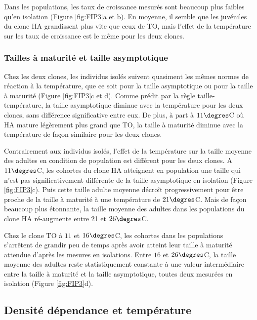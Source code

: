 Dans les populations, les taux de croissance mesurés sont beaucoup plus faibles
qu'en isolation (Figure \ref{fig:FIP3}a et b). En moyenne, il semble que les
juvéniles du clone HA grandissent plus vite que ceux de TO, mais l'effet de la
température sur les taux de croissance est le même pour les deux clones. 

\subsubsection{Tailles à maturité et taille asymptotique}

Chez les deux clones, les individus isolés suivent quasiment les mêmes normes de
réaction à la température, que ce soit pour la taille asymptotique ou pour la
taille à maturité (Figure \ref{fig:FIP3}c et d). Comme prédit par la règle
taille-température, la taille asymptotique diminue avec la température pour les
deux clones, sans différence significative entre eux. De plus, à part à
$11\degres$C où HA mature légèrement plus grand que TO, la taille à maturité
diminue avec la température de façon similaire pour les deux clones. 

Contrairement aux individus isolés, l'effet de la température sur la taille
moyenne des adultes en condition de population est différent pour les deux
clones. A $11\degres$C, les cohortes du clone HA atteignent en population une
taille qui n'est pas significativement différente de la taille asymptotique en
isolation (Figure \ref{fig:FIP3}c). Puis cette taille adulte moyenne décroît
progressivement pour être proche de la taille à maturité à une température de $21\degres$C. Mais de façon
beaucoup plus étonnante, la taille moyenne des adultes dans les populations du
clone HA ré-augmente entre 21 et $26\degres$C. 

Chez le clone TO à $11$ et $16\degres$C, les cohortes dans les populations
s'arrêtent de grandir peu de temps après avoir atteint leur taille à maturité
attendue d'après les mesures en isolations. Entre $16$ et $26\degres$C, la
taille moyenne des adultes reste statistiquement constante à une valeur intermédiaire
entre la taille à maturité et la taille asymptotique, toutes deux mesurées en
isolation (Figure \ref{fig:FIP3}d).

\subsection{Densité dépendance et température}

